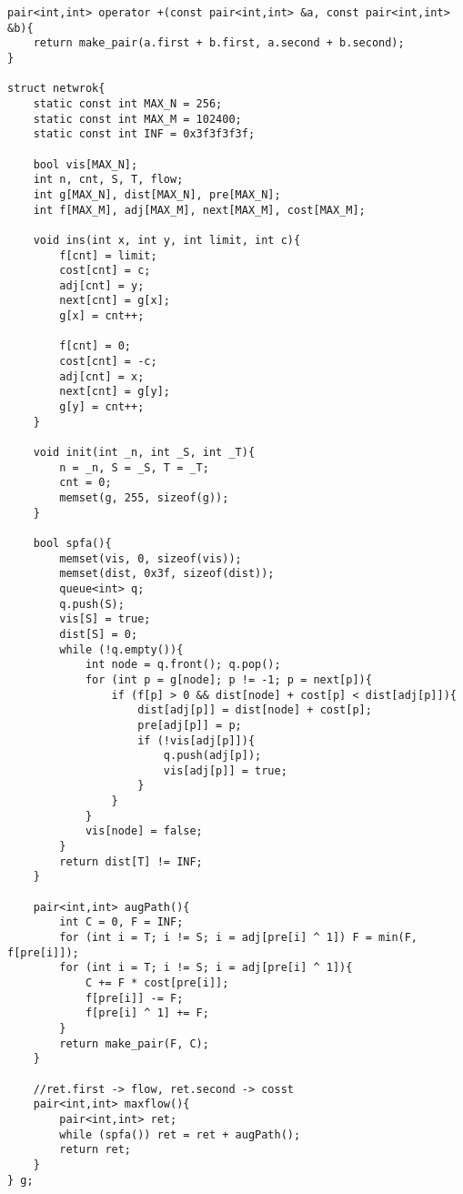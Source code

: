 \begin{verbatim}
pair<int,int> operator +(const pair<int,int> &a, const pair<int,int> &b){
    return make_pair(a.first + b.first, a.second + b.second);
}

struct netwrok{
    static const int MAX_N = 256;
    static const int MAX_M = 102400;
    static const int INF = 0x3f3f3f3f;

    bool vis[MAX_N];
    int n, cnt, S, T, flow;
    int g[MAX_N], dist[MAX_N], pre[MAX_N];
    int f[MAX_M], adj[MAX_M], next[MAX_M], cost[MAX_M];

    void ins(int x, int y, int limit, int c){
        f[cnt] = limit;
        cost[cnt] = c;
        adj[cnt] = y;
        next[cnt] = g[x];
        g[x] = cnt++;

        f[cnt] = 0;
        cost[cnt] = -c;
        adj[cnt] = x;
        next[cnt] = g[y];
        g[y] = cnt++;
    }

    void init(int _n, int _S, int _T){
        n = _n, S = _S, T = _T;
        cnt = 0;
        memset(g, 255, sizeof(g));
    }

    bool spfa(){
        memset(vis, 0, sizeof(vis));
        memset(dist, 0x3f, sizeof(dist));
        queue<int> q;
        q.push(S);
        vis[S] = true;
        dist[S] = 0;
        while (!q.empty()){
            int node = q.front(); q.pop();
            for (int p = g[node]; p != -1; p = next[p]){
                if (f[p] > 0 && dist[node] + cost[p] < dist[adj[p]]){
                    dist[adj[p]] = dist[node] + cost[p];
                    pre[adj[p]] = p;
                    if (!vis[adj[p]]){
                        q.push(adj[p]);
                        vis[adj[p]] = true;
                    }
                }
            }
            vis[node] = false;
        }
        return dist[T] != INF;
    }

    pair<int,int> augPath(){
        int C = 0, F = INF;
        for (int i = T; i != S; i = adj[pre[i] ^ 1]) F = min(F, f[pre[i]]);
        for (int i = T; i != S; i = adj[pre[i] ^ 1]){
            C += F * cost[pre[i]];
            f[pre[i]] -= F;
            f[pre[i] ^ 1] += F;
        }
        return make_pair(F, C);
    }

    //ret.first -> flow, ret.second -> cosst
    pair<int,int> maxflow(){
        pair<int,int> ret;
        while (spfa()) ret = ret + augPath();
        return ret;
    }
} g;
\end{verbatim}
